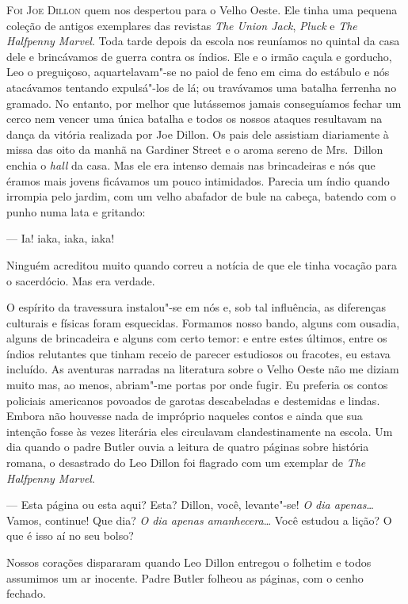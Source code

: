 \textsc{Foi Joe Dillon} quem nos despertou para o Velho Oeste.  Ele tinha uma
pequena coleção de antigos exemplares das revistas \textit{The Union
Jack}, \textit{Pluck} e \textit{The Halfpenny Marvel}.  Toda tarde
depois da escola nos reuníamos no quintal da casa dele e brincávamos de guerra
contra os índios.  Ele e o irmão caçula e gorducho, Leo o preguiçoso,
aquartelavam"-se no paiol de feno em cima do estábulo e nós atacávamos tentando
expulsá"-los de lá; ou travávamos uma batalha ferrenha no gramado.  No entanto,
por melhor que lutássemos jamais conseguíamos fechar um cerco nem vencer uma
única batalha e todos os nossos ataques resultavam na dança da vitória
realizada por Joe Dillon.  Os pais dele assistiam diariamente à missa das oito
da manhã na Gardiner Street e o aroma sereno de Mrs.~Dillon enchia o
\textit{hall} da casa.  Mas ele era intenso demais nas brincadeiras e nós que
éramos mais jovens ficávamos um pouco intimidados.  Parecia um índio quando
irrompia pelo jardim, com um velho abafador de bule na cabeça, batendo com o
punho numa lata e gritando:

--- Ia! iaka, iaka, iaka!

Ninguém acreditou muito quando correu a notícia de que ele tinha vocação para o
sacerdócio.  Mas era verdade.

O espírito da travessura instalou"-se em nós e, sob tal influência, as
diferenças culturais e físicas foram esquecidas.  Formamos nosso bando, alguns
com ousadia, alguns de brincadeira e alguns com certo temor: e entre estes
últimos, entre os índios relutantes que tinham receio de parecer estudiosos ou
fracotes, eu estava incluído.  As aventuras narradas na literatura sobre o
Velho Oeste não me diziam muito mas, ao menos, abriam"-me portas por onde fugir.
Eu preferia os contos policiais americanos povoados de garotas descabeladas e
destemidas e lindas.  Embora não houvesse nada de impróprio naqueles contos e
ainda que sua intenção fosse às vezes literária eles circulavam
clandestinamente na escola.  Um dia quando o padre Butler ouvia a leitura de
quatro páginas sobre história romana, o desastrado do Leo Dillon foi flagrado
com um exemplar de \textit{The Halfpenny Marvel}.

--- Esta página ou esta aqui?  Esta?  Dillon, você, levante"-se!  \textit{O dia
apenas}\ldots{} Vamos, continue!  Que dia?  \textit{O dia apenas
amanhecera}\ldots{}  Você estudou a lição?  O que é isso aí no seu bolso?

Nossos corações dispararam quando Leo Dillon entregou o folhetim e todos
assumimos um ar inocente.  Padre Butler folheou as páginas, com o cenho
fechado.

